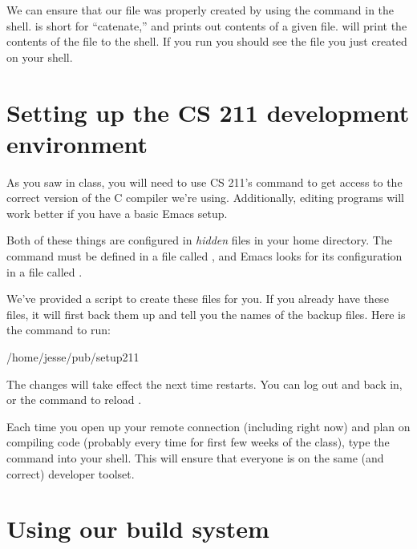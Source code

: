 \documentclass{tufte-handout}
\begin{document}
We can ensure that our file was properly created by using the
 command in the shell.  is short for
``catenate,'' and prints out contents of a given file.   will print the contents of the file to the shell. If
you run  you should see the file you just
created on your shell.

\section{Setting up the CS 211 development environment}

As you saw in class, you will need to use CS 211’s  command
to get access to the correct version of the C compiler we’re
using. Additionally,
editing programs will work better if you have a basic Emacs setup.

Both of these things are configured in \emph{hidden} files in your home
directory. The  command must be defined in a file
called , and Emacs looks for its configuration in a
file called .

We’ve provided a script to create these files for you. If you already
have these files, it will first back them up and tell you the names of
the backup files. Here is the command to run:

\begin{CmdLine}
  \prompt /home/jesse/pub/setup211
\end{CmdLine}


\noindent The changes will take effect the next time 
restarts. You can log out and back in, or the command  to reload .

Each time you open up your remote connection (including right now) and
plan on compiling code (probably every time for first few weeks of the
class), type the  command into your shell.  This will
ensure that everyone is on the same (and correct) developer toolset.

\section{Using our build system}
\end{document}
